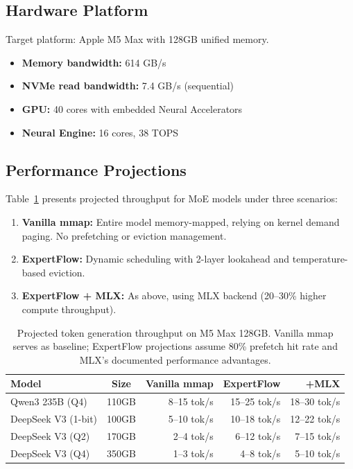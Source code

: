\documentclass[11pt]{article}
\begin{document}
\subsection{Hardware Platform}

Target platform: Apple M5 Max with 128GB unified memory.
\begin{itemize}
    \item \textbf{Memory bandwidth:} 614 GB/s
    \item \textbf{NVMe read bandwidth:} 7.4 GB/s (sequential)
    \item \textbf{GPU:} 40 cores with embedded Neural Accelerators
    \item \textbf{Neural Engine:} 16 cores, 38 TOPS
\end{itemize}

\subsection{Performance Projections}

Table~\ref{tab:performance} presents projected throughput for MoE models under three scenarios:
\begin{enumerate}
    \item \textbf{Vanilla mmap:} Entire model memory-mapped, relying on kernel demand paging. No prefetching or eviction management.
    \item \textbf{ExpertFlow:} Dynamic scheduling with 2-layer lookahead and temperature-based eviction.
    \item \textbf{ExpertFlow + MLX:} As above, using MLX backend (20--30\% higher compute throughput).
\end{enumerate}

\begin{table}[t]
\centering
\caption{Projected token generation throughput on M5 Max 128GB. Vanilla mmap serves as baseline; ExpertFlow projections assume 80\% prefetch hit rate and MLX's documented performance advantages.}
\label{tab:performance}
\begin{tabular}{lcrrr}
\toprule
\textbf{Model} & \textbf{Size} & \textbf{Vanilla mmap} & \textbf{ExpertFlow} & \textbf{+MLX} \\
\midrule
Qwen3 235B (Q4) & 110GB & 8--15 tok/s & 15--25 tok/s & 18--30 tok/s \\
DeepSeek V3 (1-bit) & 100GB & 5--10 tok/s & 10--18 tok/s & 12--22 tok/s \\
DeepSeek V3 (Q2) & 170GB & 2--4 tok/s & 6--12 tok/s & 7--15 tok/s \\
DeepSeek V3 (Q4) & 350GB & 1--3 tok/s & 4--8 tok/s & 5--10 tok/s \\
\bottomrule
\end{tabular}
\end{table}
\end{document}
